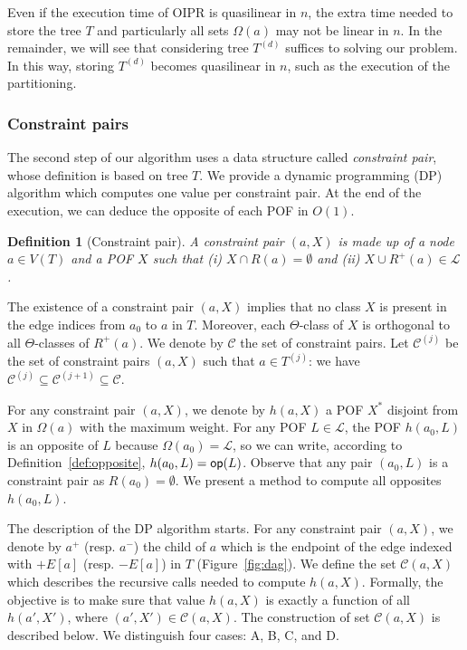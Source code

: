 \documentclass{article}
\newtheorem{definition}{Definition}
\newcommand{\opp}{\mbox{\textsf{op}}}
\begin{document}
Even if the execution time of OIPR is quasilinear in $n$, the extra time needed to store the tree $T$ and particularly all sets $\Omega(a)$ may not be linear in $n$. In the remainder, we will see that considering tree $T^{(d)}$ suffices to solving our problem. In this way, storing $T^{(d)}$ becomes quasilinear in $n$, such as the execution of the partitioning.

\subsubsection{Constraint pairs} \label{subsubsec:cp}

The second step of our algorithm uses a data structure called \textit{constraint pair}, whose definition is based on tree $T$. We provide a dynamic programming (DP) algorithm which computes one value per constraint pair. At the end of the execution, we can deduce the opposite of each POF in $O(1)$.

\begin{definition}[Constraint pair]
A constraint pair $(a,X)$ is made up of a node $a \in V(T)$ and a POF $X$ such that {\em (i)} $X \cap R(a) = \emptyset$ and {\em (ii)} $X \cup R^+(a) \in \mathcal{L}$.
\label{def:cp}
\end{definition}

The existence of a constraint pair $(a,X)$ implies that no class $X$ is present in the edge indices from $a_0$ to $a$ in $T$. Moreover, each $\Theta$-class of $X$ is orthogonal to all $\Theta$-classes of $R^+(a)$. We denote by $\mathcal{C}$ the set of constraint pairs. Let $\mathcal{C}^{(j)}$ be the set of constraint pairs $(a,X)$ such that $a\in T^{(j)}$: we have $\mathcal{C}^{(j)} \subseteq \mathcal{C}^{(j+1)} \subseteq \mathcal{C}$.

For any constraint pair $(a,X)$, we denote by $h(a,X)$ a POF $X^*$ disjoint from $X$ in $\Omega(a)$ with the maximum weight. For any POF $L \in \mathcal{L}$, the POF $h(a_0,L)$ is an opposite of $L$ because $\Omega(a_0) = \mathcal{L}$, so we can write, according to Definition~\ref{def:opposite}, $h(a_0,L) = \opp(L)$. Observe that any pair $(a_0,L)$ is a constraint pair as $R(a_0) = \emptyset$. We present a method to compute all opposites $h(a_0,L)$.

The description of the DP algorithm starts. For any constraint pair $(a,X)$, we denote by $a^+$ (resp. $a^-$) the child of $a$ which is the endpoint of the edge indexed with $+E\left[a\right]$ (resp. $-E\left[a\right]$) in $T$ (Figure~\ref{fig:dag}). 
We define the set $\mathcal{C}(a,X)$ which describes the recursive calls needed to compute $h(a,X)$. Formally, the objective is to make sure that value $h(a,X)$ is exactly a function of all $h(a',X')$, where $(a',X') \in \mathcal{C}(a,X)$.
The construction of set $\mathcal{C}(a,X)$ is described below. We distinguish four cases: A, B, C, and D.
\end{document}
